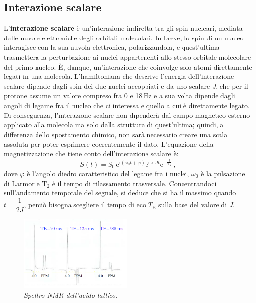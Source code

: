 \documentclass{report}
\numberwithin{equation}{section}
\numberwithin{figure}{section}
\begin{document}
\subsection{Interazione scalare}
L'\textbf{interazione scalare} è un'interazione indiretta tra gli spin nucleari, mediata dalle nuvole elettroniche degli orbitali molecolari. In breve, lo spin di un nucleo interagisce con la sua nuvola elettronica, polarizzandola, e quest'ultima trasmetterà la perturbazione ai nuclei appartenenti allo stesso orbitale molecolare del primo nucleo. È, dunque, un'interazione che coinvolge solo atomi direttamente legati in una molecola. L'hamiltoniana che descrive l'energia dell'interazione scalare dipende dagli spin dei due nuclei accoppiati e da uno scalare \textit{J}, che per il protone assume un valore compreso fra 0 e 18\,Hz e a sua volta dipende dagli angoli di legame fra il nucleo che ci interessa e quello a cui è direttamente legato. Di conseguenza, l'interazione scalare non dipenderà dal campo magnetico esterno applicato alla molecola ma solo dalla struttura di quest'ultima; quindi, a differenza dello spostamento chimico, non sarà necessario creare una scala assoluta per poter esprimere coerentemente il dato. L'equazione della magnetizzazione che tiene conto dell'interazione scalare è:
\begin{equation}
    S(t) = S_0\,\mathrm{e}^{\mathrm{i}(\omega_0t + \varphi)}\mathrm{e}^{\mathrm{i} \uppi Jt}\mathrm{e}^{-\frac{t}{\mathrm{T_2}}} \,,
    \label{3.6.3}
\end{equation}
dove $\varphi$ è l'angolo diedro caratteristico del legame fra i nuclei, $\omega_0$ è la pulsazione di Larmor e $\mathrm{T_2}$ è il tempo di rilassamento trasversale. Concentrandoci sull'andamento temporale del segnale, si deduce che si ha il massimo quando $t = \dfrac{1}{2J}$, perciò bisogna scegliere il tempo di eco $T_\mathrm{E}$ sulla base del valore di \textit{J}.

\begin{figure}
    \centering
    \includegraphics[width=0.495\textwidth]{immagini/al.png}
    \caption{\textit{Spettro NMR dell'acido lattico}.}
    \label{fig:al}
\end{figure}
\end{document}
